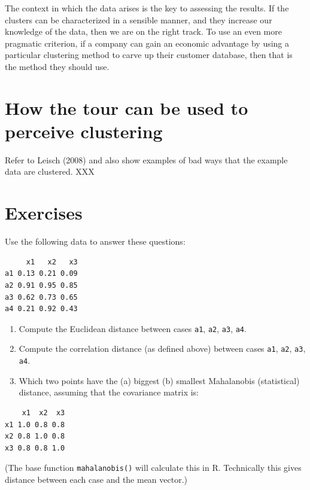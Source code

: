 \documentclass[
  letterpaper,
]{krantz}
\begin{document}
The context in which the data arises is the key to assessing the
results. If the clusters can be characterized in a sensible manner, and
they increase our knowledge of the data, then we are on the right track.
To use an even more pragmatic criterion, if a company can gain an
economic advantage by using a particular clustering method to carve up
their customer database, then that is the method they should use.

\section{How the tour can be used to perceive
clustering}\label{how-the-tour-can-be-used-to-perceive-clustering}

Refer to Leisch (2008) and also show examples of bad ways that the
example data are clustered. XXX

\section*{Exercises}\label{exercises-5}


Use the following data to answer these questions:

\begin{verbatim}
     x1   x2   x3
a1 0.13 0.21 0.09
a2 0.91 0.95 0.85
a3 0.62 0.73 0.65
a4 0.21 0.92 0.43
\end{verbatim}

\begin{enumerate}
\def\labelenumi{\arabic{enumi}.}
\item
  Compute the Euclidean distance between cases \texttt{a1}, \texttt{a2},
  \texttt{a3}, \texttt{a4}.
\item
  Compute the correlation distance (as defined above) between cases
  \texttt{a1}, \texttt{a2}, \texttt{a3}, \texttt{a4}.
\item
  Which two points have the (a) biggest (b) smallest Mahalanobis
  (statistical) distance, assuming that the covariance matrix is:
\end{enumerate}

\begin{verbatim}
    x1  x2  x3
x1 1.0 0.8 0.8
x2 0.8 1.0 0.8
x3 0.8 0.8 1.0
\end{verbatim}

(The base function \texttt{mahalanobis()} will calculate this in R.
Technically this gives distance between each case and the mean vector.)
\end{document}
